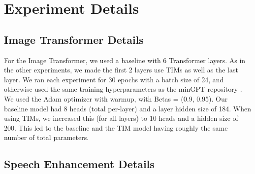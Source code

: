 


\section{Experiment Details}



\subsection{Image Transformer Details}

For the Image Transformer, we used a baseline with 6 Transformer layers.  As in the other experiments, we made the first 2 layers use TIMs as well as the last layer.  We ran each experiment for 30 epochs with a batch size of 24, and otherwise used the same training hyperparameters as the minGPT repository \citep{mingpt2020}.  We used the Adam optimizer with warmup, with Betas = (0.9, 0.95).  Our baseline model had 8 heads (total per-layer) and a layer hidden size of 184.  When using TIMs, we increased this (for all layers) to 10 heads and a hidden size of 200.  This led to the baseline and the TIM model having roughly the same number of total parameters.  



\subsection{Speech Enhancement Details}

